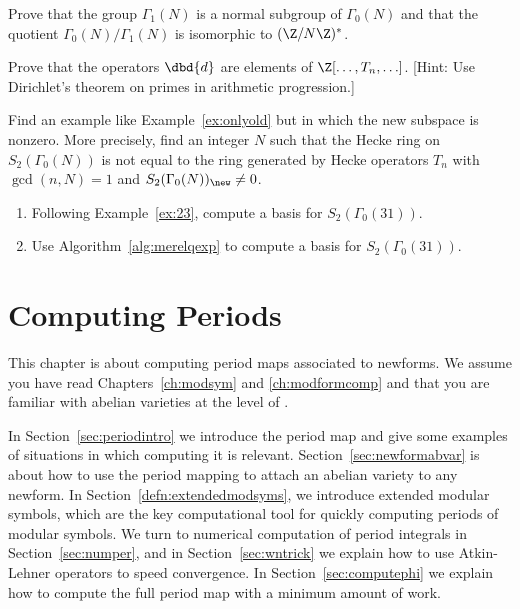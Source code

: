 \begin{exercises}
\item \label{ex:g0g1quo}
  Prove that the group $\Gamma_1(N)$ is a normal subgroup of
  $\Gamma_0(N)$ and that the quotient $\Gamma_0(N)/\Gamma_1(N)$ is
  isomorphic to $(\Z/N\Z)^*$.

\item \label{ex:dbdinhecke} Prove that the operators $\dbd{d}$ are elements
of $\Z[\ldots,T_n,\ldots]$.  [Hint: Use Dirichlet's theorem
on primes in arithmetic progression.]

\item \label{exer:onlyold} Find an example like
  Example~\ref{ex:onlyold} but in which the new subspace is nonzero.
  More precisely, find an integer $N$ such that the Hecke ring on
  $S_2(\Gamma_0(N))$ is not equal to the ring generated by Hecke
  operators $T_n$ with $\gcd(n,N)=1$ and $S_2(\Gamma_0(N))_{\new}\neq
  0$.

\item \label{ex:31} 
\begin{enumerate}
\item  Following Example~\ref{ex:23}, compute a
basis for $S_2(\Gamma_0(31))$. 
\item Use Algorithm~\ref{alg:merelqexp} to compute a basis
for $S_2(\Gamma_0(31))$. 
\end{enumerate}

\end{exercises}







\chapter{Computing Periods}\label{ch:periods}


This chapter is about computing period maps associated to 
newforms.
We assume you have read Chapters~\ref{ch:modsym} and
\ref{ch:modformcomp} and that you are familiar with abelian
varieties at the level of \cite{rosen:abvars}.

In Section~\ref{sec:periodintro} we introduce the period map and give
some examples of situations in which computing it is relevant.
Section~\ref{sec:newformabvar} is about how to use the period mapping
to attach an abelian variety to any newform.  In
Section~\ref{defn:extendedmodsyms}, we introduce extended modular
symbols, which are the key computational tool for quickly computing
periods of modular symbols.  We turn to numerical computation of
period integrals in Section~\ref{sec:numper}, and in
Section~\ref{sec:wntrick} we explain how to use Atkin-Lehner operators
to speed convergence. In Section~\ref{sec:computephi} we explain how
to compute the full period map with a minimum amount of work.

